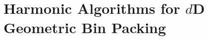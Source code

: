 \chapter{Harmonic Algorithms for \texorpdfstring{$d$}{d}D Geometric Bin Packing}
\label{chap:hdhk}











